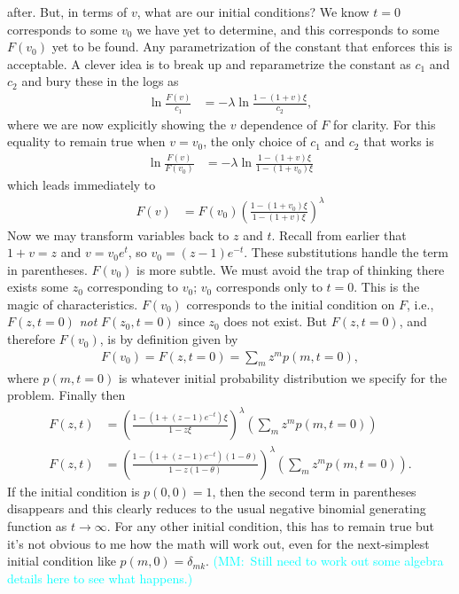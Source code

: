 \documentclass[12pt]{article}%
\newcommand{\mmnote}[1]{\textcolor{cyan}{(MM:~#1)}}
\begin{document}
after. But, in terms of $v$, what are our initial conditions? We know
$t=0$ corresponds to some $v_0$ we have yet to determine, and this
corresponds to some $F(v_0)$ yet to be found. Any parametrization of the
constant that enforces this is acceptable. A clever idea is to break up
and reparametrize the constant as $c_1$ and $c_2$ and bury these in the
logs as
\begin{align}
\ln \frac{F(v)}{c_1} &= -\lambda \ln\frac{1-(1+v)\xi}{c_2},
\end{align}
where we are now explicitly showing the $v$ dependence of $F$ for clarity.
For this equality to remain true when $v=v_0$,
the only choice of $c_1$ and $c_2$ that works is
\begin{align}
\ln \frac{F(v)}{F(v_0)} &= -\lambda \ln\frac{1-(1+v)\xi}{1-(1+v_0)\xi}
\end{align}
which leads immediately to
\begin{align}
F(v) &= F(v_0) \left(\frac{1-(1+v_0)\xi}{1-(1+v)\xi}\right)^{\lambda}
\end{align}
Now we may transform variables back to $z$ and $t$.
Recall from earlier that $1+v=z$ and $v=v_0 e^t$, so $v_0 = (z-1)e^{-t}$.
These substitutions handle the term in parentheses. $F(v_0)$ is more subtle.
We must avoid the trap of thinking there exists some $z_0$ corresponding to $v_0$;
$v_0$ corresponds only to $t=0$. This is the magic of characteristics.
$F(v_0)$ corresponds to the initial condition on $F$, i.e., $F(z,t=0)$
\textit{not} $F(z_0,t=0)$ since $z_0$ does not exist.
But $F(z,t=0)$, and therefore $F(v_0)$, is by definition given by
\begin{align}
F(v_0) = F(z,t=0) = \sum_m z^m p(m, t=0),
\end{align}
where $p(m, t=0)$ is whatever initial probability distribution
we specify for the problem. Finally then
\begin{align}
F(z, t) &=  \left(\frac{1-(1+(z-1)e^{-t})\xi}{1-z\xi}\right)^{\lambda}
                \left(\sum_m z^m p(m, t=0)\right)
\\
F(z, t) &=  \left(\frac{1-(1+(z-1)e^{-t})(1-\theta)}{1-z(1-\theta)}\right)^{\lambda}
                \left(\sum_m z^m p(m, t=0)\right).
\end{align}
If the initial condition is $p(0,0)=1$, then the second term in
parentheses disappears and this clearly reduces to the usual negative
binomial generating function as $t\rightarrow\infty$. For any other
initial condition, this has to remain true but it's not obvious to me
how the math will work out, even for the next-simplest initial condition
like $p(m,0) = \delta_{mk}$.
\mmnote{Still need to work out some algebra details here to see what happens.}
\end{document}
